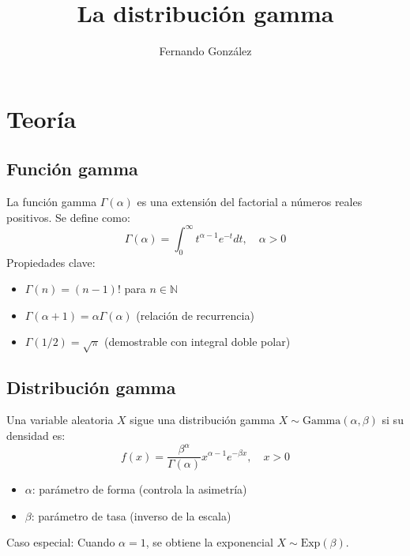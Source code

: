 \documentclass[letterpaper]{article}
\title{La distribución gamma}
\author{Fernando González}
\begin{document}
	
	\maketitle
	
	\section{Teoría}
	
	\subsection{Función gamma}
	La función gamma $\Gamma(\alpha)$ es una extensión del factorial a números reales positivos. Se define como:
	\[
	\Gamma(\alpha) = \int_0^\infty t^{\alpha-1} e^{-t} dt, \quad \alpha > 0
	\]
	Propiedades clave:
	\begin{itemize}
		\item $\Gamma(n) = (n-1)!$ para $n \in \mathbb{N}$
		\item $\Gamma(\alpha+1) = \alpha \Gamma(\alpha)$ (relación de recurrencia)
		\item $\Gamma(1/2) = \sqrt{\pi}$ (demostrable con integral doble polar)
	\end{itemize}
	
	\subsection{Distribución gamma}
	Una variable aleatoria $X$ sigue una distribución gamma $X \sim \text{Gamma}(\alpha, \beta)$ si su densidad es:
	\[
	f(x) = \frac{\beta^\alpha}{\Gamma(\alpha)} x^{\alpha-1} e^{-\beta x}, \quad x > 0
	\]
	\begin{itemize}
		\item $\alpha$: parámetro de forma (controla la asimetría)
		\item $\beta$: parámetro de tasa (inverso de la escala)
	\end{itemize}
	
	Caso especial: Cuando $\alpha=1$, se obtiene la exponencial $X \sim \text{Exp}(\beta)$.
	
\end{document}
